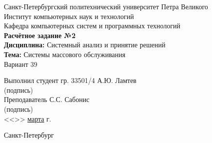 \begin{titlepage}
\begin{center}
	Санкт-Петербургский политехнический университет Петра Великого\\[0.3cm]
	Институт компьютерных наук и технологий \\[0.3cm]
	Кафедра компьютерных систем и программных технологий\\[4cm]
	
	\textbf{Расчётное задание №2}\\[2mm]
	\textbf{Дисциплина:} Системный анализ и принятие решений\\[2mm]
	\textbf{Тема:} Системы массового обслуживания\\[2mm]
	Вариант 39\\[6.5cm]
\end{center}

\begin{flushleft}
	\hspace*{5mm} Выполнил студент гр. 33501/4  \hspace*{3cm}\sign[3cm]\hspace*{2mm} А.Ю. Ламтев\\
	\hspace*{10.85cm} (подпись)\\[2.5mm]
	\hspace*{5mm} Преподаватель \hspace*{6.45cm}\sign[3cm]\hspace*{2mm} С.С. Сабонис\\
	\hspace*{10.85cm} (подпись)\\[2.5mm]
	\hspace*{11.1cm} <<\underline{\the\day}>> \underline{\hspace{5mm}марта\hspace{5mm}} \the\year\hspace{1mm} г.
\end{flushleft}

\vfill

\begin{center}
	Санкт-Петербург\\
	\the\year
\end{center}
\end{titlepage}
\addtocounter{page}{1}